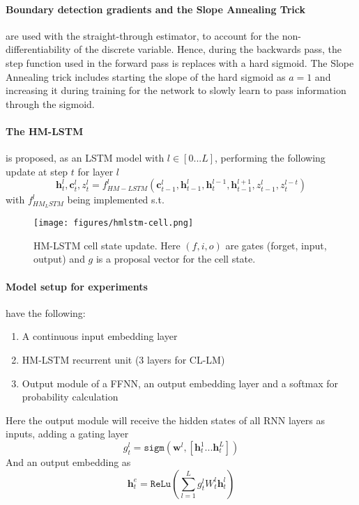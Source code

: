 \paragraph{Boundary detection gradients and the Slope Annealing Trick} are used with the straight-through estimator, to account for the non-differentiability of the discrete variable. 
Hence, during the backwards pass, the step function used in the forward pass is replaces with a hard sigmoid.
The Slope Annealing trick includes starting the slope of the hard sigmoid as $a=1$ and increasing it during training for the network to slowly learn to pass information through the sigmoid. 


\paragraph{The HM-LSTM} is proposed, as an LSTM model with \(l\in[0...L]\), performing the following update at step $t$ for layer $l$
\begin{equation}\label{eq:hmlstm-update}
     \mathbf{h}^l_t, \mathbf{c}^l_t, z^l_t =
    f^l_{HM-LSTM}(
        \mathbf{c}^l_{t-1}, 
        \mathbf{h}^l_{t-1}, \mathbf{h}^{l-1}_{t}, \mathbf{h}^{l+1}_{t-1},
        z^l_{t-1}, z^{l-t}_t
        )
\end{equation}
with \(f^l_{HM_LSTM}\) being implemented s.t.


\begin{figure}
    \texttt{[image: figures/hmlstm-cell.png]}
    \caption{
        HM-LSTM cell state update.
        Here $(f,i,o)$ are gates (forget, input, output) and $g$ is a proposal vector for the cell state.
        }
    \label{eq:hmlstm-cell}
\end{figure}



\paragraph{Model setup for experiments} have the following:
\begin{enumerate}
    \item A continuous input embedding layer
    \item HM-LSTM recurrent unit (3 layers for CL-LM)
    \item Output module of a FFNN, an output embedding layer and a softmax for probability calculation
\end{enumerate}
Here the output module will receive the hidden states of all RNN layers as inputs, adding a gating layer
\begin{equation}
    g^l_t = \mathtt{sigm}(\mathbf{w}^l, [\mathbf{h}^1_t ... \mathbf{h}^L_t])
    \label{eq:hmlstm-output-gate}
\end{equation}
And an output embedding as
\begin{equation}
    \mathbf{h}^e_t = \mathtt{ReLu}
    \left( 
        \sum_{l=1}^L 
        g^l_t
        W^l_t
        \mathbf{h}^l_t   
     \right)
    \label{eq:hmlstm-output-embedding}
\end{equation}



